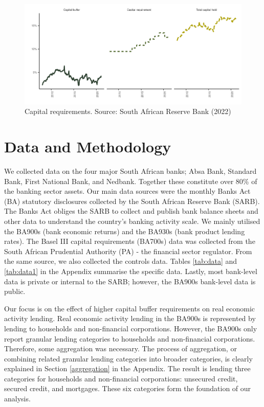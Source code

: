 \documentclass[
  12,
]{article}
\begin{document}
\begin{figure}[H]

\includegraphics{Bank_capital_and_bank_lending_files/figure-latex/capital-1} \hfill{}

\caption{Capital requirements. Source: South African Reserve Bank (2022)}\label{fig:capital}
\end{figure}

\hypertarget{data}{%
\section{Data and Methodology}\label{data}}

We collected data on the four major South African banks; Absa Bank, Standard Bank, First National Bank, and Nedbank. Together these constitute over 80\% of the banking sector assets. Our main data sources were the monthly Banks Act (BA) statutory disclosures collected by the South African Reserve Bank (SARB). The Banks Act obliges the SARB to collect and publish bank balance sheets and other data to understand the country's banking activity scale. We mainly utilised the BA900s (bank economic returns) and the BA930s (bank product lending rates). The Basel III capital requirements (BA700s) data was collected from the South African Prudential Authority (PA) - the financial sector regulator. From the same source, we also collected the controls data. Tables \ref{tab:data} and \ref{tab:data1} in the Appendix summarise the specific data. Lastly, most bank-level data is private or internal to the SARB; however, the BA900s bank-level data is public.

Our focus is on the effect of higher capital buffer requirements on real economic activity lending. Real economic activity lending in the BA900s is represented by lending to households and non-financial corporations. However, the BA900s only report granular lending categories to households and non-financial corporations. Therefore, some aggregation was necessary. The process of aggregation, or combining related granular lending categories into broader categories, is clearly explained in Section \ref{aggregation} in the Appendix. The result is lending three categories for households and non-financial corporations: unsecured credit, secured credit, and mortgages. These six categories form the foundation of our analysis.
\end{document}
